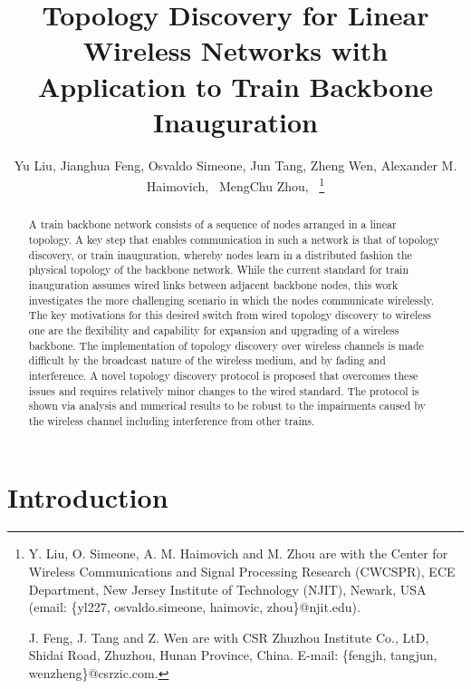 \documentclass[10pt,english,two column]{IEEEtran}
\begin{document}
\title{Topology Discovery for Linear Wireless Networks with Application
to Train Backbone Inauguration}


\author{Yu Liu, Jianghua Feng, Osvaldo Simeone,
Jun Tang, Zheng Wen, Alexander M. Haimovich,~
MengChu Zhou,~ \thanks{Y. Liu, O. Simeone, A. M. Haimovich and M. Zhou are with the Center
for Wireless Communications and Signal Processing Research (CWCSPR),
ECE Department, New Jersey Institute of Technology (NJIT), Newark,
USA (email: \{yl227, osvaldo.simeone, haimovic, zhou\}@njit.edu). 

J. Feng, J. Tang and Z. Wen are with CSR Zhuzhou Institute Co., LtD,
Shidai Road, Zhuzhou, Hunan Province, China. E-mail: \{fengjh, tangjun,
wenzheng\}@csrzic.com.}}
\maketitle
\begin{abstract}
A train backbone network consists of a sequence of nodes arranged
in a linear topology. A key step that enables communication in such
a network is that of topology discovery, or train inauguration, whereby
nodes learn in a distributed fashion the physical topology of the
backbone network. While the current standard for train inauguration
assumes wired links between adjacent backbone nodes, this work investigates
the more challenging scenario in which the nodes communicate wirelessly.
The key motivations for this desired switch from wired topology discovery
to wireless one are the flexibility and capability for expansion and
upgrading of a wireless backbone. The implementation of topology discovery
over wireless channels is made difficult by the broadcast nature of
the wireless medium, and by fading and interference. A novel topology
discovery protocol is proposed that overcomes these issues and requires
relatively minor changes to the wired standard. The protocol is shown
via analysis and numerical results to be robust to the impairments
caused by the wireless channel including interference from other trains. 
\end{abstract}


\section{Introduction\label{sec:Introduction}}
\end{document}
